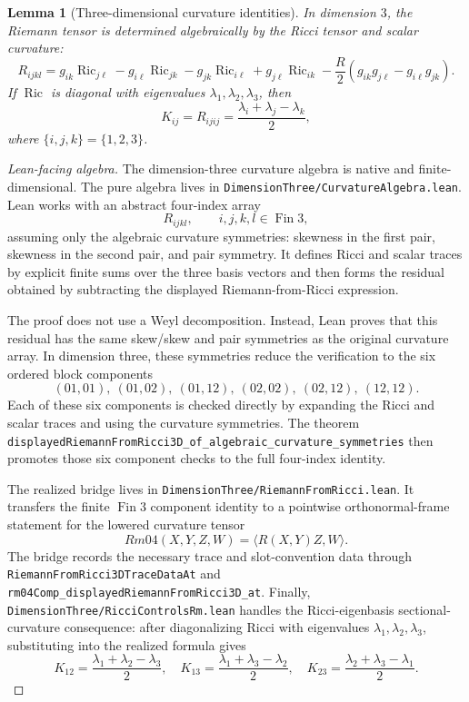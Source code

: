 \documentclass[11pt]{article}
\theoremstyle{plain}
\newtheorem{lemma}[theorem]{Lemma}
\theoremstyle{definition}
\theoremstyle{remark}
\newcommand{\Ric}{\operatorname{Ric}}
\newcommand{\leanref}[1]{\nolinkurl{#1}}
\newcommand{\leanfile}[1]{\nolinkurl{#1}}
\newcommand{\rffile}[1]{\leanfile{#1}}
\begin{document}
\begin{lemma}[Three-dimensional curvature identities]
\label{lem:3d-curvature-identities}
In dimension $3$, the Riemann tensor is determined algebraically by the Ricci
tensor and scalar curvature:
\[
R_{ijkl}
=
g_{ik}\Ric_{j\ell}-g_{i\ell}\Ric_{jk}
-g_{jk}\Ric_{i\ell}+g_{j\ell}\Ric_{ik}
-\frac R2\left(g_{ik}g_{j\ell}-g_{i\ell}g_{jk}\right).
\]
If $\Ric$ is diagonal with eigenvalues $\lambda_1,\lambda_2,\lambda_3$, then
\[
K_{ij}=R_{ijij}=\frac{\lambda_i+\lambda_j-\lambda_k}{2},
\]
where $\{i,j,k\}=\{1,2,3\}$.
\end{lemma}

\begin{proof}[Lean-facing algebra]
The dimension-three curvature algebra is native and finite-dimensional.  The
pure algebra lives in \rffile{DimensionThree/CurvatureAlgebra.lean}.  Lean
works with an abstract four-index array
\[
  R_{ijkl},\qquad i,j,k,l\in \operatorname{Fin} 3,
\]
assuming only the algebraic curvature symmetries: skewness in the first pair,
skewness in the second pair, and pair symmetry.  It defines Ricci and scalar
traces by explicit finite sums over the three basis vectors and then forms the
residual obtained by subtracting the displayed Riemann-from-Ricci expression.

The proof does not use a Weyl decomposition.  Instead, Lean proves that this
residual has the same skew/skew and pair symmetries as the original curvature
array.  In dimension three, these symmetries reduce the verification to the six
ordered block components
\[
  (01,01),\ (01,02),\ (01,12),\ (02,02),\ (02,12),\ (12,12).
\]
Each of these six components is checked directly by expanding the Ricci and
scalar traces and using the curvature symmetries.  The theorem
\leanref{displayedRiemannFromRicci3D_of_algebraic_curvature_symmetries}
then promotes those six component checks to the full four-index identity.

The realized bridge lives in \rffile{DimensionThree/RiemannFromRicci.lean}.  It
transfers the finite \(\operatorname{Fin} 3\) component identity to a pointwise
orthonormal-frame statement for the lowered curvature tensor
\[
  Rm04(X,Y,Z,W)=\langle R(X,Y)Z,W\rangle .
\]
The bridge records the necessary trace and slot-convention data through
\leanref{RiemannFromRicci3DTraceDataAt} and
\leanref{rm04Comp_displayedRiemannFromRicci3D_at}.  Finally,
\rffile{DimensionThree/RicciControlsRm.lean} handles the Ricci-eigenbasis
sectional-curvature consequence: after diagonalizing Ricci with eigenvalues
\(\lambda_1,\lambda_2,\lambda_3\), substituting into the realized formula gives
\[
  K_{12}=\frac{\lambda_1+\lambda_2-\lambda_3}{2},
  \quad
  K_{13}=\frac{\lambda_1+\lambda_3-\lambda_2}{2},
  \quad
  K_{23}=\frac{\lambda_2+\lambda_3-\lambda_1}{2}.
\]
\end{proof}
\end{document}

